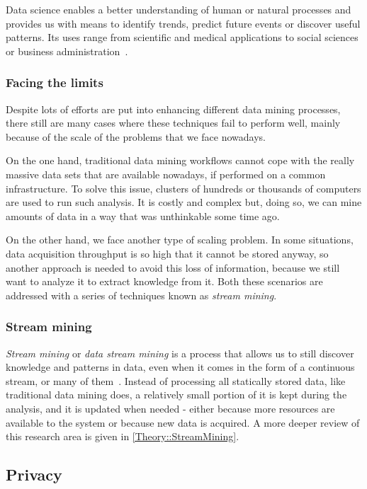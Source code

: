 Data science enables a better understanding of human or natural processes and provides
us with means to identify trends, predict future events or discover useful patterns.
Its uses range from scientific and medical applications to social sciences or business
administration~\citep{Fayyad:FromDataMining}.

\subsubsection{Facing the limits}

Despite lots of efforts are put into enhancing different data mining processes, there still
are many cases where these techniques fail to perform well, mainly because of the scale of
the problems that we face nowadays.

On the one hand, traditional data mining workflows cannot cope with the really massive
data sets that are available nowadays, if performed on a common infrastructure.
To solve this issue, clusters of hundreds or thousands of computers are used to run
such analysis. It is costly and complex but, doing so, we can mine amounts of data in a way that
was unthinkable some time ago.

On the other hand, we face another type of scaling problem. In some situations, data
acquisition throughput is so high that it cannot be stored anyway, so another approach
is needed to avoid this loss of information, because we still want to analyze it to extract
knowledge from it. Both these scenarios are addressed with a
series of techniques known as \textit{stream mining}.

\subsubsection{Stream mining}

\textit{Stream mining} or \textit{data stream mining} is a process that allows us to
still discover knowledge and patterns in data, even when it comes in the form of a
continuous stream, or many of them~\citep{Rajaraman:MiningMassiveDatasets}. Instead of processing
all statically stored data, like traditional data mining does, a relatively small
portion of it is kept during the analysis, and it is updated when needed - either because
more resources are available to the system or because new data is acquired. A more deeper
review of this research area is given in \ref{Theory::StreamMining}.

\subsection{Privacy}
\label{Introduction::Context::Privacy}

